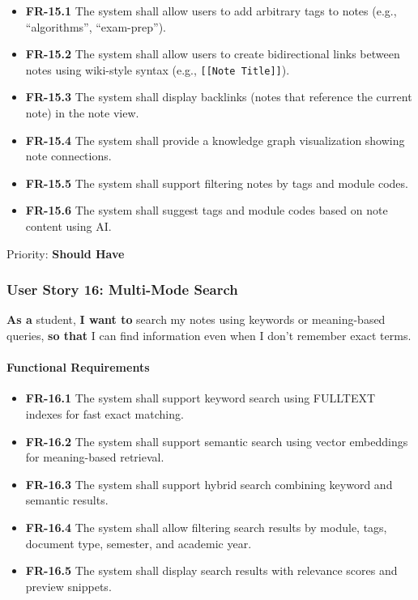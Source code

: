 \documentclass[12pt,a4paper]{article}
\begin{document}
\begin{itemize}
    \item \textbf{FR-15.1} The system shall allow users to add arbitrary tags to notes (e.g., ``algorithms'', ``exam-prep'').
    \item \textbf{FR-15.2} The system shall allow users to create bidirectional links between notes using wiki-style syntax (e.g., \texttt{[[Note Title]]}).
    \item \textbf{FR-15.3} The system shall display backlinks (notes that reference the current note) in the note view.
    \item \textbf{FR-15.4} The system shall provide a knowledge graph visualization showing note connections.
    \item \textbf{FR-15.5} The system shall support filtering notes by tags and module codes.
    \item \textbf{FR-15.6} The system shall suggest tags and module codes based on note content using AI.
\end{itemize}

Priority: \textbf{Should Have}

\subsubsection{User Story 16: Multi-Mode Search}

\textbf{As a} student, \textbf{I want to} search my notes using keywords or meaning-based queries, \textbf{so that} I can find information even when I don't remember exact terms.

\paragraph{Functional Requirements}

\begin{itemize}
    \item \textbf{FR-16.1} The system shall support keyword search using FULLTEXT indexes for fast exact matching.
    \item \textbf{FR-16.2} The system shall support semantic search using vector embeddings for meaning-based retrieval.
    \item \textbf{FR-16.3} The system shall support hybrid search combining keyword and semantic results.
    \item \textbf{FR-16.4} The system shall allow filtering search results by module, tags, document type, semester, and academic year.
    \item \textbf{FR-16.5} The system shall display search results with relevance scores and preview snippets.
\end{itemize}
\end{document}
